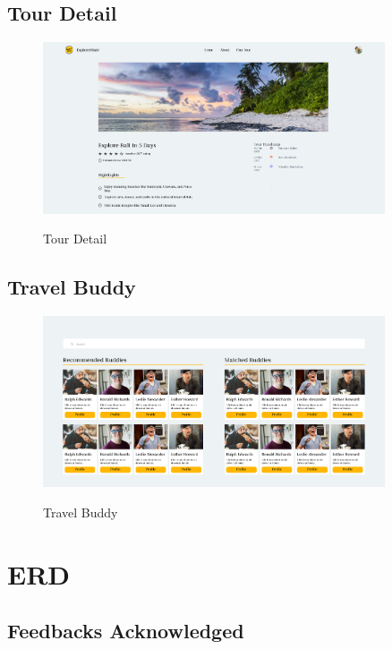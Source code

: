 \documentclass[12pt]{article}
\begin{document}
\newpage

\subsection{Tour Detail}
\begin{figure}[H]
    \centering
        \includegraphics[width=0.9\textwidth]{Mock UI/Tour Detail.png}
        \label{fig:tour_detail_ui}
    \caption{Tour Detail}
\end{figure}

\subsection{Travel Buddy}
\begin{figure}[H]
    \centering
        \includegraphics[width=0.9\textwidth]{Mock UI/Travel Buddy.png}
        \label{fig:travel_buddy_ui}
    \caption{Travel Buddy}
\end{figure}

\newpage

\section{ERD}
\subsection{Feedbacks Acknowledged}
\end{document}
